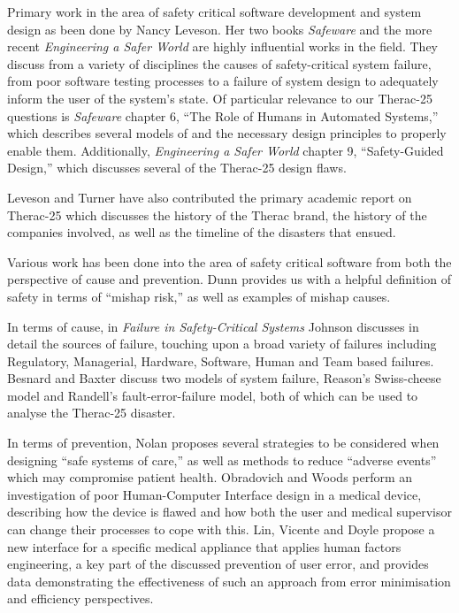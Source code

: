 \documentclass{cshonours}
\newcommand{\ther}{Therac-25\xspace}
\begin{document}
Primary work in the area of safety critical software development and system design as been done by Nancy Leveson. Her two books \textit{Safeware} \cite{safeware} and the more recent \textit{Engineering a Safer World} \cite{saferworld} are highly influential works in the field. They discuss from a variety of disciplines the causes of safety-critical system failure, from poor software testing processes to a failure of system design to adequately inform the user of the system's state. Of particular relevance to our \ther questions is \textit{Safeware} chapter 6, ``The Role of Humans in Automated Systems,'' which describes several models of \hci and the necessary design principles to properly enable them. Additionally, \textit{Engineering a Safer World} chapter 9, ``Safety-Guided Design,'' which discusses several of the \ther design flaws.

Leveson and Turner \cite{leveson1993investigation} have also contributed the primary academic report on \ther which discusses the history of the Therac brand, the history of the companies involved, as well as the timeline of the disasters that ensued.

Various work has been done into the area of safety critical software from both the perspective of cause and prevention. Dunn \cite{dunn2003designing} provides us with a helpful definition of safety in terms of ``mishap risk,'' as well as examples of mishap causes.

In terms of cause, in \textit{Failure in Safety-Critical Systems} \cite[ch.~3]{johnson2003failure} Johnson discusses in detail the sources of failure, touching upon a broad variety of failures including Regulatory, Managerial, Hardware, Software, Human and Team based failures. Besnard and Baxter \cite{besnard2003human} discuss two models of system failure, Reason's Swiss-cheese model and Randell's fault-error-failure model, both of which can be used to analyse the \ther disaster.

In terms of prevention, Nolan \cite{nolan2000system} proposes several strategies to be considered when designing ``safe systems of care,'' as well as methods to reduce ``adverse events''  which may compromise patient health. Obradovich and Woods \cite{obradovich1996users} perform an investigation of poor Human-Computer Interface design in a medical device, describing how the device is flawed and how both the user and medical supervisor can change their processes to cope with this. Lin, Vicente and Doyle \cite{lin2001patient} propose a new interface for a specific medical appliance that applies human factors engineering, a key part of the discussed prevention of user error, and provides data demonstrating the effectiveness of such an approach from error minimisation and efficiency perspectives.
\end{document}
